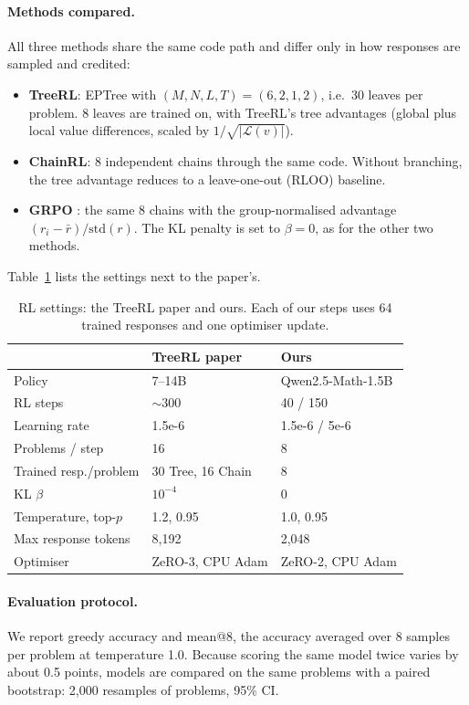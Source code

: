 \paragraph{Methods compared.}
All three methods share the same code path and differ only in how responses are sampled and credited:
\begin{itemize}
\item \textbf{TreeRL}: EPTree with $(M,N,L,T)=(6,2,1,2)$, i.e.\ 30 leaves per problem. 8 leaves are trained on, with TreeRL's tree advantages (global plus local value differences, scaled by $1/\sqrt{|\mathcal{L}(v)|}$).
\item \textbf{ChainRL}: 8 independent chains through the same code. Without branching, the tree advantage reduces to a leave-one-out (RLOO) baseline.
\item \textbf{GRPO} \citep{shao2024deepseekmath}: the same 8 chains with the group-normalised advantage $(r_i-\bar r)/\mathrm{std}(r)$. The KL penalty is set to $\beta=0$, as for the other two methods.
\end{itemize}
Table~\ref{tab:hparams} lists the settings next to the paper's.

\begin{table}[t]
\centering\footnotesize
\setlength{\tabcolsep}{3pt}
\begin{tabular}{@{}lll@{}}
\toprule
 & TreeRL paper & Ours \\
\midrule
Policy & 7--14B & Qwen2.5-Math-1.5B \\
RL steps & $\sim$300 & 40 / 150 \\
Learning rate & 1.5e-6 & 1.5e-6 / 5e-6 \\
Problems / step & 16 & 8 \\
Trained resp./problem & 30 Tree, 16 Chain & 8 \\
KL $\beta$ & $10^{-4}$ & 0 \\
Temperature, top-$p$ & 1.2, 0.95 & 1.0, 0.95 \\
Max response tokens & 8{,}192 & 2{,}048 \\
Optimiser & ZeRO-3, CPU Adam & ZeRO-2, CPU Adam \\
\bottomrule
\end{tabular}
\caption{RL settings: the TreeRL paper and ours. Each of our steps uses 64 trained responses and one optimiser update.}
\label{tab:hparams}
\end{table}

\paragraph{Evaluation protocol.}
We report greedy accuracy and mean@8, the accuracy averaged over 8 samples per problem at temperature 1.0. Because scoring the same model twice varies by about 0.5 points, models are compared on the same problems with a paired bootstrap: 2{,}000 resamples of problems, 95\% CI.

